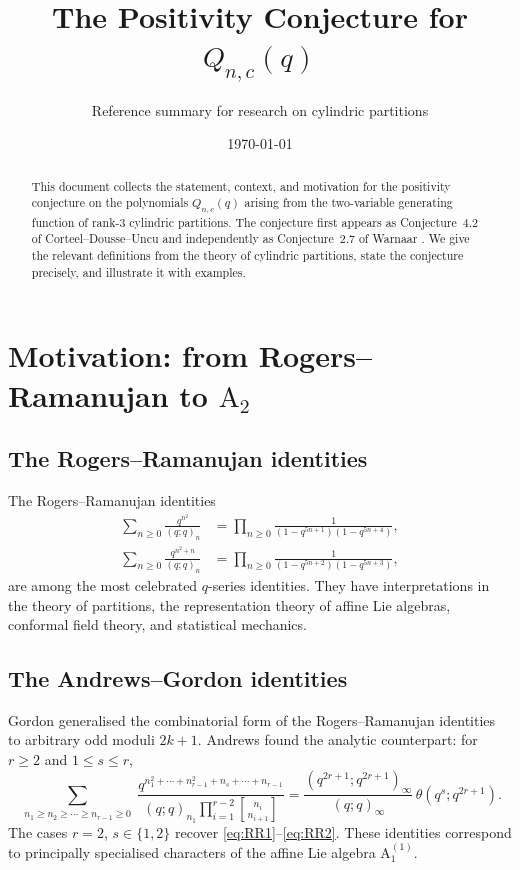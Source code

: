 \documentclass[11pt]{article}
\title{The Positivity Conjecture for $Q_{n,c}(q)$}
\author{Reference summary for research on cylindric partitions}
\date{\today}
\theoremstyle{plain}
\theoremstyle{definition}
\newcommand{\qpoch}[2]{(#1;#2)_\infty}
\newcommand{\qpochn}[3]{(#1;#2)_{#3}}
\newcommand{\qbin}[2]{\genfrac{[}{]}{0pt}{}{#1}{#2}}
\newcommand{\jtheta}[2]{\theta(#1;#2)}
\begin{document}
\maketitle

\begin{abstract}
This document collects the statement, context, and motivation for the
positivity conjecture on the polynomials $Q_{n,c}(q)$ arising from the
two-variable generating function of rank-3 cylindric partitions.
The conjecture first appears as Conjecture~4.2 of Corteel--Dousse--Uncu
\cite{CDU} and independently as Conjecture~2.7 of Warnaar \cite{W}.
We give the relevant definitions from the theory of cylindric partitions,
state the conjecture precisely, and illustrate it with examples.
\end{abstract}

\tableofcontents

\section{Motivation: from Rogers--Ramanujan to $\mathrm{A}_2$}
\label{sec:motivation}

\subsection{The Rogers--Ramanujan identities}

The Rogers--Ramanujan identities \cite{RR}
\begin{align}
  \sum_{n \geq 0} \frac{q^{n^2}}{\qpochn{q}{q}{n}}
  &= \prod_{n \geq 0} \frac{1}{(1-q^{5n+1})(1-q^{5n+4})},
  \label{eq:RR1} \\
  \sum_{n \geq 0} \frac{q^{n^2+n}}{\qpochn{q}{q}{n}}
  &= \prod_{n \geq 0} \frac{1}{(1-q^{5n+2})(1-q^{5n+3})},
  \label{eq:RR2}
\end{align}
are among the most celebrated $q$-series identities.
They have interpretations in the theory of partitions, the representation
theory of affine Lie algebras, conformal field theory, and statistical
mechanics.

\subsection{The Andrews--Gordon identities}

Gordon \cite{Gordon} generalised the combinatorial form of the
Rogers--Ramanujan identities to arbitrary odd moduli $2k+1$.
Andrews \cite{Andrews} found the analytic counterpart: for
$r \geq 2$ and $1 \leq s \leq r$,
\begin{equation}\label{eq:AG}
  \sum_{\substack{n_1 \geq n_2 \geq \cdots \geq n_{r-1} \geq 0}}
  \frac{q^{n_1^2 + \cdots + n_{r-1}^2 + n_s + \cdots + n_{r-1}}}
       {\qpochn{q}{q}{n_1} \prod_{i=1}^{r-2} \qbin{n_i}{n_{i+1}}}
  = \frac{\qpoch{q^{2r+1}}{q^{2r+1}}}{\qpoch{q}{q}}
    \,\jtheta{q^s}{q^{2r+1}}.
\end{equation}
The cases $r = 2$, $s \in \{1, 2\}$ recover \eqref{eq:RR1}--\eqref{eq:RR2}.
These identities correspond to principally specialised characters of the
affine Lie algebra $\mathrm{A}_1^{(1)}$.
\end{document}
